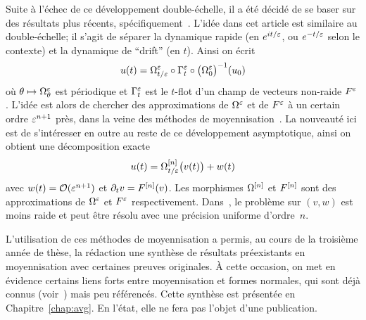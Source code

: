 Suite à l'échec de ce développement double-échelle, il a été décidé de se baser sur des résultats plus récents, spécifiquement~\cite{chartier.2020.new}. L'idée dans cet article est similaire au double-échelle; il s'agit de séparer la dynamique rapide (en $e^{it/\varepsilon}$, ou $e^{-t/\varepsilon}$ selon le contexte) et la dynamique de \enquote{drift} (en $t$). Ainsi on écrit 
\begin{equation*}
    u(t) = \Omega^{\varepsilon}_{t/\varepsilon} \circ \Gamma^{\varepsilon}_t \circ \big( \Omega^{\varepsilon}_0 \big)^{-1} (u_0)
\end{equation*}
où $\theta \mapsto \Omega^{\varepsilon}_\theta$ est périodique et $\Gamma^{\varepsilon}_t$ est le $t$-flot d'un champ de vecteurs non-raide $F^{\varepsilon}$. L'idée est alors de chercher des approximations de $\Omega^{\varepsilon}$ et de $F^{\varepsilon}$ à un certain ordre $\varepsilon^{n+1}$ près, dans la veine des méthodes de moyennisation~\cite{perko.1969.higher,lochak.1988.multiphase,sanders.2007.averaging,chartier.2010.higher,chartier.2012.formal,castella.2015.stroboscopic}. La nouveauté ici est de s'intéresser en outre au reste de ce développement asymptotique, ainsi on obtient une décomposition exacte 
\begin{equation*}
    u(t) = \Omega^{[n]}_{t/\varepsilon} \big( v(t) \big) + w(t)
\end{equation*}
avec $w(t) = \mathcal{O}(\varepsilon^{n+1})$ et $\partial_t v = F^{[n]}(v)$. Les morphismes $\Omega^{[n]}$ et $F^{[n]}$ sont des approximations de $\Omega^{\varepsilon}$ et $F^{\varepsilon}$ respectivement. Dans~\cite{chartier.2020.new}, le problème sur $(v,w)$ est moins raide et peut être résolu avec une précision uniforme d'ordre~$n$. 


L'utilisation de ces méthodes de moyennisation a permis, au cours de la troisième année de thèse, la rédaction une synthèse de résultats préexistants en moyennisation avec certaines preuves originales. À cette occasion, on met en évidence certains liens forts entre moyennisation et formes normales, qui sont déjà connus (voir~\cite{sanders.2007.averaging}) mais peu référencés. Cette synthèse est présentée en Chapitre~\ref{chap:avg}. En l'état, elle ne fera pas l'objet d'une publication.


